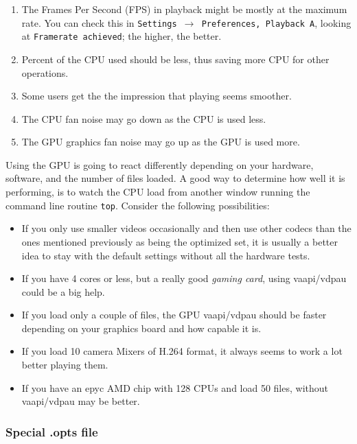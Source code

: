 \begin{enumerate}
	\item The Frames Per Second (FPS) in playback might be mostly at the maximum rate.  You can check
	this in \texttt{Settings $\rightarrow$ Preferences, Playback A}, looking at \texttt{Framerate achieved}; the higher, the better.
	\item Percent of the CPU used should be less, thus saving more CPU for other operations.
	\item Some users get the the impression that playing seems smoother.
	\item The CPU fan noise may go down as the CPU is used less.
	\item The GPU graphics fan noise may go up as the GPU is used more.
\end{enumerate}

Using the GPU is going to react differently depending on your hardware, software, and the number of files loaded. A good way to determine how well it is performing, is to watch the CPU load from another window running the command line routine \texttt{top}. Consider the following possibilities:

\begin{itemize}
	\item If you only use smaller videos occasionally and then use other codecs than the ones mentioned
	previously as being the optimized set, it is usually a better idea to stay with the default settings
	without all the hardware tests.
	\item If you have 4 cores or less, but a really good \textit{gaming card}, using vaapi/vdpau could be a big help.
	\item If you load only a couple of files, the GPU vaapi/vdpau should be faster depending on your graphics
	board and how capable it is.
	\item If you load 10 camera Mixers of H.264 format, it always seems to work a lot better playing them.
	\item If you have an epyc AMD chip with 128 CPUs and load 50 files, without vaapi/vdpau may be better.
\end{itemize}

\subsubsection*{Special .opts file}%
\label{ssub:special_opts_file}

